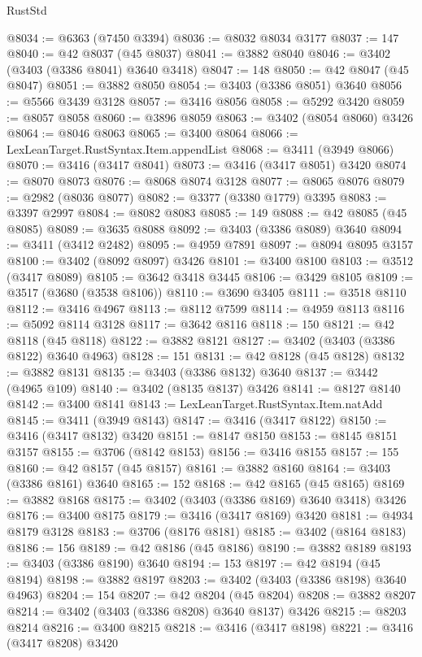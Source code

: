 \begin{lexlean}{RustStd}
\begin{coremodule}
@8034 := @6363 (@7450 @3394)
@8036 := @8032 @8034 @3177
@8037 := 147
@8040 := @42 @8037 (@45 @8037)
@8041 := @3882 @8040
@8046 := @3402 (@3403 (@3386 @8041) @3640 @3418)
@8047 := 148
@8050 := @42 @8047 (@45 @8047)
@8051 := @3882 @8050
@8054 := @3403 (@3386 @8051) @3640
@8056 := @5566 @3439 @3128
@8057 := @3416 @8056
@8058 := @5292 @3420
@8059 := @8057 @8058
@8060 := @3896 @8059
@8063 := @3402 (@8054 @8060) @3426
@8064 := @8046 @8063
@8065 := @3400 @8064
@8066 := LexLeanTarget.RustSyntax.Item.appendList
@8068 := @3411 (@3949 @8066)
@8070 := @3416 (@3417 @8041)
@8073 := @3416 (@3417 @8051) @3420
@8074 := @8070 @8073
@8076 := @8068 @8074 @3128
@8077 := @8065 @8076
@8079 := @2982 (@8036 @8077)
@8082 := @3377 (@3380 @1779) @3395
@8083 := @3397 @2997
@8084 := @8082 @8083
@8085 := 149
@8088 := @42 @8085 (@45 @8085)
@8089 := @3635 @8088
@8092 := @3403 (@3386 @8089) @3640
@8094 := @3411 (@3412 @2482)
@8095 := @4959 @7891
@8097 := @8094 @8095 @3157
@8100 := @3402 (@8092 @8097) @3426
@8101 := @3400 @8100
@8103 := @3512 (@3417 @8089)
@8105 := @3642 @3418 @3445
@8106 := @3429 @8105
@8109 := @3517 (@3680 (@3538 @8106))
@8110 := @3690 @3405
@8111 := @3518 @8110
@8112 := @3416 @4967
@8113 := @8112 @7599
@8114 := @4959 @8113
@8116 := @5092 @8114 @3128
@8117 := @3642 @8116
@8118 := 150
@8121 := @42 @8118 (@45 @8118)
@8122 := @3882 @8121
@8127 := @3402 (@3403 (@3386 @8122) @3640 @4963)
@8128 := 151
@8131 := @42 @8128 (@45 @8128)
@8132 := @3882 @8131
@8135 := @3403 (@3386 @8132) @3640
@8137 := @3442 (@4965 @109)
@8140 := @3402 (@8135 @8137) @3426
@8141 := @8127 @8140
@8142 := @3400 @8141
@8143 := LexLeanTarget.RustSyntax.Item.natAdd
@8145 := @3411 (@3949 @8143)
@8147 := @3416 (@3417 @8122)
@8150 := @3416 (@3417 @8132) @3420
@8151 := @8147 @8150
@8153 := @8145 @8151 @3157
@8155 := @3706 (@8142 @8153)
@8156 := @3416 @8155
@8157 := 155
@8160 := @42 @8157 (@45 @8157)
@8161 := @3882 @8160
@8164 := @3403 (@3386 @8161) @3640
@8165 := 152
@8168 := @42 @8165 (@45 @8165)
@8169 := @3882 @8168
@8175 := @3402 (@3403 (@3386 @8169) @3640 @3418) @3426
@8176 := @3400 @8175
@8179 := @3416 (@3417 @8169) @3420
@8181 := @4934 @8179 @3128
@8183 := @3706 (@8176 @8181)
@8185 := @3402 (@8164 @8183)
@8186 := 156
@8189 := @42 @8186 (@45 @8186)
@8190 := @3882 @8189
@8193 := @3403 (@3386 @8190) @3640
@8194 := 153
@8197 := @42 @8194 (@45 @8194)
@8198 := @3882 @8197
@8203 := @3402 (@3403 (@3386 @8198) @3640 @4963)
@8204 := 154
@8207 := @42 @8204 (@45 @8204)
@8208 := @3882 @8207
@8214 := @3402 (@3403 (@3386 @8208) @3640 @8137) @3426
@8215 := @8203 @8214
@8216 := @3400 @8215
@8218 := @3416 (@3417 @8198)
@8221 := @3416 (@3417 @8208) @3420

\end{coremodule}
\end{lexlean}
